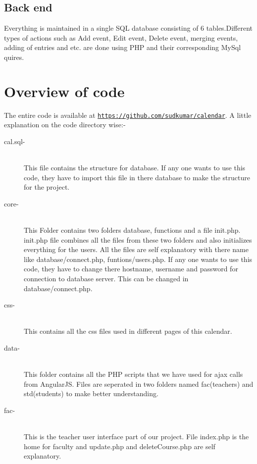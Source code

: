 \documentclass[a4paper, 12pt]{article}
\begin{document}
\subsection{Back end}
Everything is maintained in a single SQL database consisting of 6 tables.Different types of actions such as Add event, Edit event, Delete event, merging events, adding of entries and etc. are done using PHP and their corresponding MySql quires.
\section{Overview of code}
The entire code is available at          \texttt{\href{https://github.com/sudkumar/calendar}{https://github.com/sudkumar/calendar}}. A little explanation on the code directory wise:-
\begin{description}
\item[cal.sql-] \hfill \\
This file contains the structure for database. If any one wants to use this code, they have to import this file in there database to make the structure for the project.

\item[core-] \hfill \\
This Folder contains two folders database, functions and a file init.php. init.php file combines all the files from these two folders and also initializes everything for the users. All the files are self explanatory with there name like database/connect.php, funtions/users.php. If any one wants to use this code, they have to change there hostname, username and password for connection to database server. This can be changed in database/connect.php.

\item[css-] \hfill \\
This contains all the css files used in different pages of this calendar.

\item[data-] \hfill \\
This folder contains all the PHP scripts that we have used for ajax calls from AngularJS. Files are seperated in two folders named fac(teachers) and std(students) to make better understanding. 

\item[fac-] \hfill \\
This is the teacher user interface part of our project. File index.php is the home for faculty and update.php and deleteCourse.php are self explanatory.


\end{description}
\end{document}
